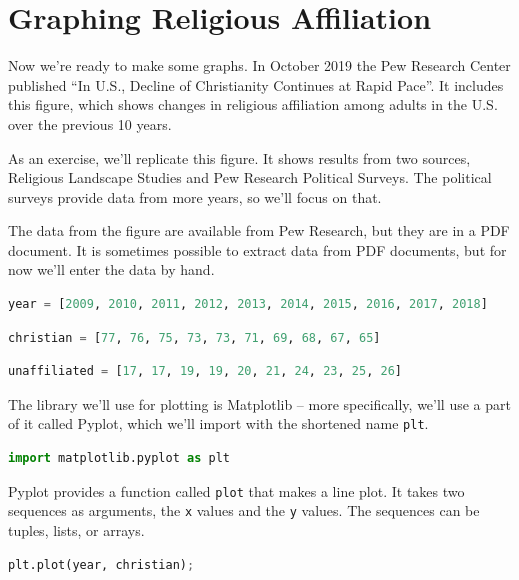 \documentclass[
]{book}
\newcommand{\passthrough}[1]{#1}
\begin{document}
\section{Graphing Religious
Affiliation}\label{graphing-religious-affiliation}

Now we're ready to make some graphs. In October 2019 the Pew Research
Center published ``In U.S., Decline of Christianity Continues at Rapid
Pace''. It includes this figure, which shows changes in religious
affiliation among adults in the U.S. over the previous 10 years.

As an exercise, we'll replicate this figure. It shows results from two
sources, Religious Landscape Studies and Pew Research Political Surveys.
The political surveys provide data from more years, so we'll focus on
that.

The data from the figure are available from Pew Research, but they are
in a PDF document. It is sometimes possible to extract data from PDF
documents, but for now we'll enter the data by hand.

\begin{lstlisting}[language=Python]
year = [2009, 2010, 2011, 2012, 2013, 2014, 2015, 2016, 2017, 2018]
\end{lstlisting}

\begin{lstlisting}[language=Python]
christian = [77, 76, 75, 73, 73, 71, 69, 68, 67, 65]
\end{lstlisting}

\begin{lstlisting}[language=Python]
unaffiliated = [17, 17, 19, 19, 20, 21, 24, 23, 25, 26]
\end{lstlisting}

The library we'll use for plotting is Matplotlib -- more specifically,
we'll use a part of it called Pyplot, which we'll import with the
shortened name \passthrough{\lstinline!plt!}.

\begin{lstlisting}[language=Python]
import matplotlib.pyplot as plt
\end{lstlisting}

Pyplot provides a function called \passthrough{\lstinline!plot!} that
makes a line plot. It takes two sequences as arguments, the
\passthrough{\lstinline!x!} values and the \passthrough{\lstinline!y!}
values. The sequences can be tuples, lists, or arrays.

\begin{lstlisting}[language=Python]
plt.plot(year, christian);
\end{lstlisting}
\end{document}
